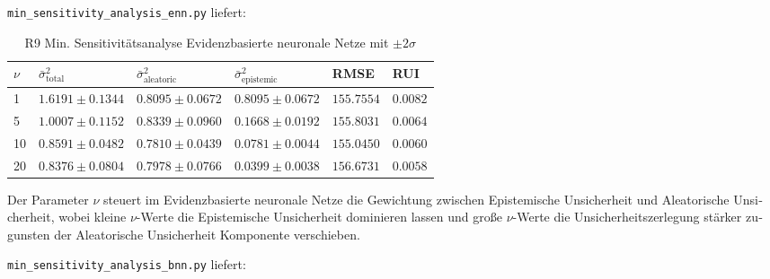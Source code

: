 \begin{otherlanguage}{ngerman}

\newline 
\texttt{min\_sensitivity\_analysis\_enn.py} liefert:

\begin{table}[!htbp]
\centering
\footnotesize
\begin{tabularx}{\textwidth}{|X|X|X|X|X|X|}
\hline
$\nu$ 
& $\bar{\sigma}^2_{\text{total}}$
& $\bar{\sigma}^2_{\text{aleatoric}}$
& $\bar{\sigma}^2_{\text{epistemic}}$
& RMSE 
& RUI \\
\hline
1  & $1.6191 \pm 0.1344$ & $0.8095 \pm 0.0672$ & $0.8095 \pm 0.0672$ & $155.7554$ & $0.0082$ \\
\hline
5  & $1.0007 \pm 0.1152$ & $0.8339 \pm 0.0960$ & $0.1668 \pm 0.0192$ & $155.8031$ & $0.0064$ \\
\hline
10 & $0.8591 \pm 0.0482$ & $0.7810 \pm 0.0439$ & $0.0781 \pm 0.0044$ & $155.0450$ & $0.0060$ \\
\hline
20 & $0.8376 \pm 0.0804$ & $0.7978 \pm 0.0766$ & $0.0399 \pm 0.0038$ & $156.6731$ & $0.0058$ \\
\hline
\end{tabularx}
\caption{R9 Min. Sensitivitätsanalyse \gls{Evidenzbasierte neuronale Netze} mit $\pm 2\sigma$}
\label{tab:enn_results}
\end{table}

Der Parameter $\nu$ steuert im \gls{Evidenzbasierte neuronale Netze} die Gewichtung zwischen \gls{Epistemische Unsicherheit} und \gls{Aleatorische Unsicherheit}, wobei kleine $\nu$-Werte die \gls{Epistemische Unsicherheit} dominieren lassen und große $\nu$-Werte die Unsicherheitszerlegung stärker zugunsten der \gls{Aleatorische Unsicherheit} Komponente verschieben.

\newline
\texttt{min\_sensitivity\_analysis\_bnn.py} liefert:


\end{otherlanguage}
